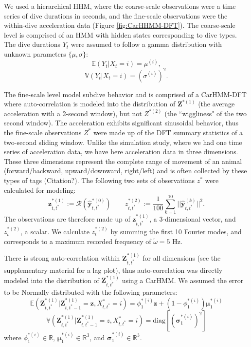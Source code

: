 We used a hierarchical HHM, where the coarse-scale observations were a time series of dive durations in seconds, and the fine-scale observations were the within-dive acceleration data (Figure \ref{fig:CarHHMM-DFT}). The coarse-scale level is comprised of an HMM with hidden states corresponding to dive types. The dive durations $Y_t$ were assumed to follow a gamma distribution with unknown parameters $\{\mu,\sigma\}$:
$$\mathbb{E}(Y_t|X_t = i) = \mu^{(i)},$$
$$\mathbb{V}(Y_t|X_t = i) = \left(\sigma^{(i)}\right)^2.$$

The fine-scale level model subdive behavior and is comprised of a CarHMM-DFT where auto-correlation is modeled into the distribution of $\mathbf{Z}^{*(1)}$ (the average acceleration with a 2-second window), but not $Z^{*(2)}$ (the ``wiggliness" of the two second window). The acceleration exhibits significant sinusoidal behavior, thus the fine-scale observations $Z^*$ were made up of the DFT summary statistics of a two-second sliding window. Unlike the simulation study, where we had one time series of acceleration data, we have here acceleration data in three dimensions. These three dimensions represent the complete range of movement of an animal (forward/backward, upward/downward, right/left) and is often collected by these types of tags (Citation?). The following two sets of observations $z^*$ were calculated for modeling:
%
$$\mathbf{z}_{t,t^*}^{*(1)} := \mathcal{R}\left(\hat{\mathbf{y}}^{*(0)}_{t,t^*}\right) \qquad z_{t,t^*}^{*(2)} := \frac{1}{100}\sum_{k=1}^{10}||\hat{\mathbf{y}}^{(k)}_{t,t^*}||^2.$$
The observations are therefore made up of $\mathbf{z}_{t,t^*}^{*(1)}$, a 3-dimensional vector, and $z_t^{*(2)}$, a scalar. We calculate $z_t^{*(2)}$ by summing the first 10 Fourier modes, and corresponds to a maximum recorded frequency of $\tilde \omega = 5$ Hz. 

There is strong auto-correlation within $\mathbf{Z}^{*(1)}_{t,t^*}$ for all dimensions (see the supplementary material for a lag plot), thus auto-correlation was directly modeled into the distribution of $\mathbf{Z}^{*(1)}_{t,t^*}$ using a CarHMM. We assumed the error to be Normally distributed with the following parameters:
%
$$\mathbb{E}(\mathbf{Z}^{*(1)}_{t,t^*}|\mathbf{Z}^{*(1)}_{t,t^*-1} = \mathbf{z}, X^*_{t,t^*} = i) = \phi_1^{*(i)} \mathbf{z} + (1-\phi_1^{*(i)}) \mathbf{\mu}_1^{*(i)}$$
$$\mathbb{V}(\mathbf{Z}^{*(1)}_{t,t^*}|\mathbf{Z}^{*(1)}_{t,t^*-1} = z,X^*_{t,t^*} = i) = \text{diag}\left[\left(\mathbf{\sigma}_1^{*(i)}\right)^2\right]$$
%
where $\phi_1^{*(i)} \in \mathbb{R}$, $\mathbf{\mu}_1^{*(i)} \in \mathbb{R}^3$, and $\mathbf{\sigma}_1^{*(i)} \in \mathbb{R}^3$.

